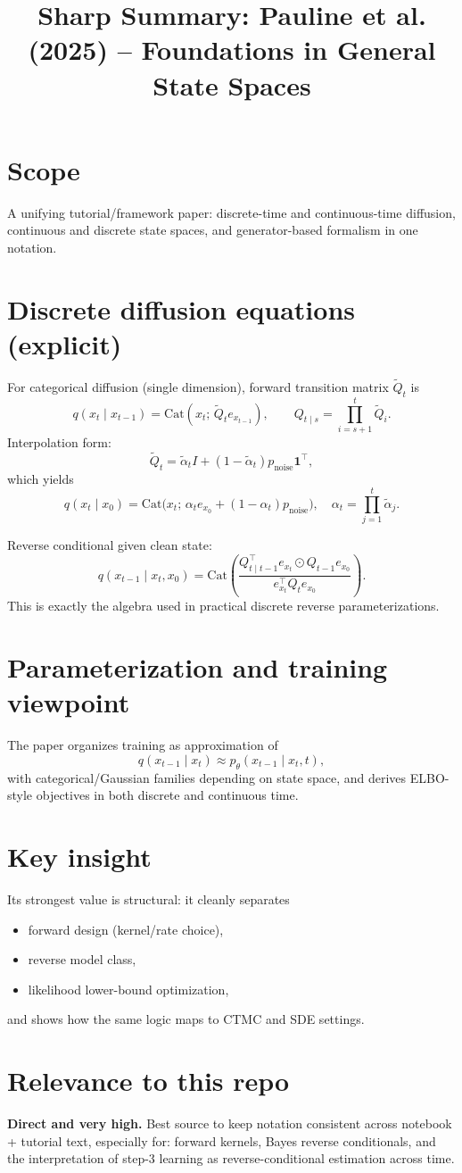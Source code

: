 \documentclass[11pt]{article}
\title{Sharp Summary: Pauline et al. (2025) -- Foundations in General State Spaces}
\author{}
\date{}
\begin{document}
\maketitle

\section*{Scope}
A unifying tutorial/framework paper: discrete-time and continuous-time diffusion, continuous and discrete state spaces, and generator-based formalism in one notation.

\section*{Discrete diffusion equations (explicit)}
For categorical diffusion (single dimension), forward transition matrix $\tilde Q_t$ is
\[
q(x_t\mid x_{t-1})=\mathrm{Cat}(x_t;\,\tilde Q_t e_{x_{t-1}}),
\qquad
Q_{t\mid s}=\prod_{i=s+1}^t \tilde Q_i.
\]
Interpolation form:
\[
\tilde Q_t=\tilde\alpha_t I+(1-\tilde\alpha_t)p_{\text{noise}}\mathbf 1^\top,
\]
which yields
\[
q(x_t\mid x_0)=\mathrm{Cat}\big(x_t;\,\alpha_t e_{x_0}+(1-\alpha_t)p_{\text{noise}}\big),
\quad
\alpha_t=\prod_{j=1}^t\tilde\alpha_j.
\]

Reverse conditional given clean state:
\[
q(x_{t-1}\mid x_t,x_0)
=\mathrm{Cat}\!\left(
\frac{Q_{t\mid t-1}^\top e_{x_t}\odot Q_{t-1}e_{x_0}}
{e_{x_t}^\top Q_t e_{x_0}}
\right).
\]
This is exactly the algebra used in practical discrete reverse parameterizations.

\section*{Parameterization and training viewpoint}
The paper organizes training as approximation of
\[
q(x_{t-1}\mid x_t)
\approx p_\theta(x_{t-1}\mid x_t,t),
\]
with categorical/Gaussian families depending on state space, and derives ELBO-style objectives in both discrete and continuous time.

\section*{Key insight}
Its strongest value is structural: it cleanly separates
\begin{itemize}
\item forward design (kernel/rate choice),
\item reverse model class,
\item likelihood lower-bound optimization,
\end{itemize}
and shows how the same logic maps to CTMC and SDE settings.

\section*{Relevance to this repo}
\textbf{Direct and very high.}
Best source to keep notation consistent across notebook + tutorial text, especially for: forward kernels, Bayes reverse conditionals, and the interpretation of step-3 learning as reverse-conditional estimation across time.
\end{document}
